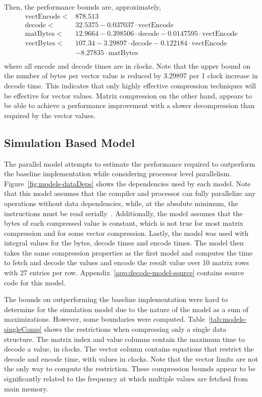 Then, the performance bounds are, approximately,
\begin{align*}
\mathrm{vectEncode} <& 878.513 \\
\mathrm{decode} <& 32.5375 - 0.037037\cdot\mathrm{vectEncode} \\
\mathrm{matBytes} <& 12.9664 - 0.398506\cdot\mathrm{decode}- 0.0147595\cdot\mathrm{vectEncode}\\
\mathrm{vectBytes} <& 107.34  - 3.29897\cdot\mathrm{decode} - 0.122184\cdot\mathrm{vectEncode} \\
	&- 8.27835\cdot\mathrm{matBytes}\\
\end{align*}
where all encode and decode times are in clocks.
Note that the upper bound on the number of bytes per vector value is reduced by 3.29897 per 1 clock increase in decode time.
This indicates that only highly effective compression techniques will be effective for vector values.
Matrix compression on the other hand, appears to be able to achieve a performance improvement with a slower decompression than required by the vector values.

\subsection{Simulation Based Model}
The parallel model attempts to estimate the performance required to outperform the baseline implementation while considering processor level parallelism.
Figure~\ref{fig:models-dataDeps} shows the dependencies used by each model.
Note that this model assumes that the compiler and processor can fully parallelize any operations without data dependencies, while, at the absolute minimum, the instructions must be read serially~\cite{Hennessy:1990:ComputerArchitecture}.
Additionally, the model assumes that the bytes of each compressed value is constant, which is not true for most matrix compression and for some vector compression.
Lastly, the model was used with integral values for the bytes, decode times and encode times.
The model then takes the same compression properties as the first model and computes the time to fetch and decode the values and encode the result value over 10 matrix rows with 27 entries per row.
Appendix~\ref{app:decode-model-source} contains source code for this model.



The bounds on outperforming the baseline implementation were hard to determine for the simulation model due to the nature of the model as a sum of maximizations.
However, some boundaries were computed.
%
%
Table~\ref{tab:models-singleComp} shows the restrictions when compressing only a single data structure.
The matrix index and value columns contain the maximum time to decode a value, in clocks.
The vector column contains equations that restrict the decode and encode time, with values in clocks.
Note that the vector limits are not the only way to compute the restriction.
These compression bounds appear to be significantly related to the frequency at which multiple values are fetched from main memory.



